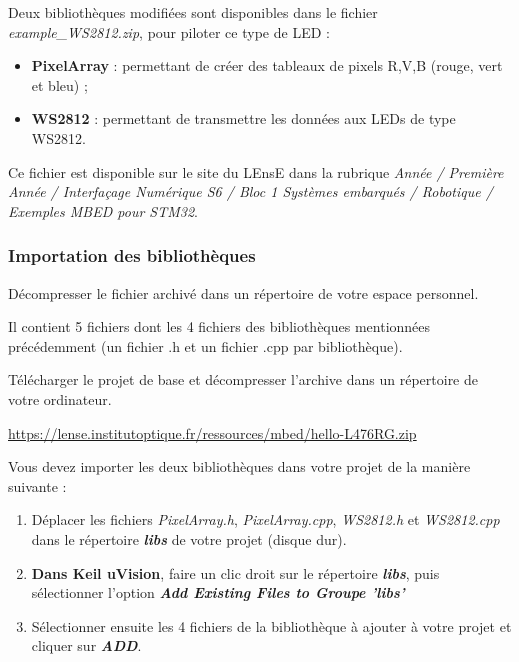 \documentclass[a4paper,11pt,titlepage]{article} %
\begin{document}
Deux bibliothèques modifiées sont disponibles dans le fichier \textsl{example\_WS2812.zip}, pour piloter ce type de LED :

\begin{itemize}
	\item \textbf{PixelArray} : permettant de créer des tableaux de pixels R,V,B (rouge, vert et bleu) ;
	\item \textbf{WS2812} : permettant de transmettre les données aux LEDs de type WS2812.
\end{itemize}

Ce fichier est disponible sur le site du LEnsE dans la rubrique \textit{Année / Première Année / Interfaçage Numérique S6 / Bloc 1 Systèmes embarqués / Robotique / Exemples MBED pour STM32}.

\subsubsection{Importation des bibliothèques}

\Manip Décompresser le fichier archivé dans un répertoire de votre espace personnel.

Il contient 5 fichiers dont les 4 fichiers des bibliothèques mentionnées précédemment (un fichier .h et un fichier .cpp par bibliothèque).


\Manip Télécharger le projet de base et décompresser l'archive dans un répertoire de votre ordinateur.

\href{https://lense.institutoptique.fr/ressources/mbed/hello-L476RG.zip}{https://lense.institutoptique.fr/ressources/mbed/hello-L476RG.zip}

\medskip

Vous devez importer les deux bibliothèques dans votre projet de la manière suivante :

\begin{enumerate}
	\item Déplacer les fichiers \textsl{PixelArray.h}, \textsl{PixelArray.cpp}, \textsl{WS2812.h} et \textsl{WS2812.cpp} dans le répertoire \textsl{\textbf{libs}} de votre projet (disque dur).

	\medskip	
	
	\item \textbf{Dans Keil uVision}, faire un clic droit sur le répertoire \textsl{\textbf{libs}}, puis sélectionner l'option \textsl{\textbf{Add Existing Files to Groupe 'libs'}}
	
	\item Sélectionner ensuite les 4 fichiers de la bibliothèque à ajouter à votre projet et cliquer sur \textsl{\textbf{ADD}}.
\end{enumerate}
\end{document}
